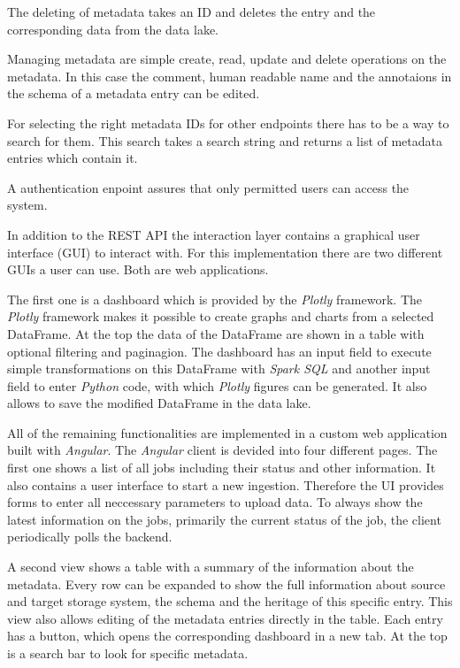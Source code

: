 \documentclass[conference]{IEEEtran}
\begin{document}
The deleting of metadata takes an ID and deletes the entry and the corresponding data from the data
lake.

Managing metadata are simple create, read, update and delete operations on the metadata. 
In this case the comment, human readable name and the annotaions in the schema of a metadata entry 
can be edited.

For selecting the right metadata IDs for other endpoints there has to be a way to search for them.
This search takes a search string and returns a list of metadata entries which contain it.

A authentication enpoint assures that only permitted users can access the system.

In addition to the REST API the interaction layer contains a graphical user interface (GUI) to 
interact with.
For this implementation there are two different GUIs a user can use.
Both are web applications.

The first one is a dashboard which is provided by the \textit{Plotly} framework. 
The \textit{Plotly} framework makes it possible to create graphs and charts from a selected 
DataFrame. 
At the top the data of the DataFrame are shown in a table with optional filtering and paginagion. 
The dashboard has an input field to execute simple transformations on this DataFrame with 
\textit{Spark SQL} and another input field to enter \textit{Python} code, with which \textit{Plotly}
 figures can be generated.
It also allows to save the modified DataFrame in the data lake.

All of the remaining functionalities are implemented in a custom web application built with 
\textit{Angular}.
The \textit{Angular} client is devided into four different pages.
The first one shows a list of all jobs including their status and other information. 
It also contains a user interface to start a new ingestion.
Therefore the UI provides forms to enter all neccessary parameters to upload data. 
To always show the latest information on the jobs, primarily the current status of the job, the 
client periodically polls the backend.

A second view shows a table with a summary of the information about the metadata. 
Every row can be expanded to show the full information about source and target storage system, the 
schema and the heritage of this specific entry.
This view also allows editing of the metadata entries directly in the table.
Each entry has a button, which opens the corresponding dashboard in a new tab.
At the top is a search bar to look for specific metadata.
\end{document}
